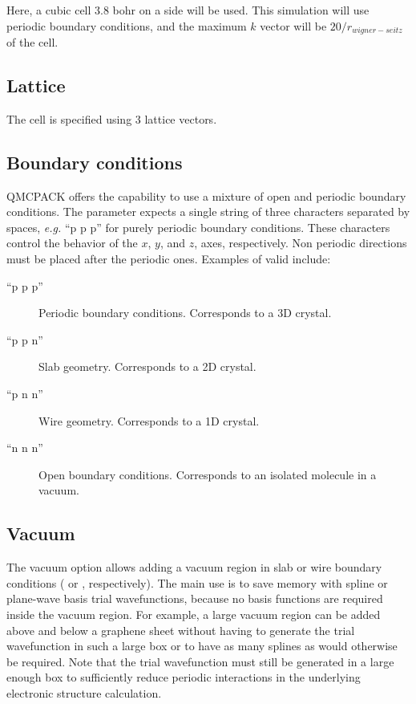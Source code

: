 Here, a cubic cell 3.8 bohr on a side will be used.
This simulation will use periodic boundary conditions, and the maximum
$k$ vector will be $20/r_{wigner-seitz}$ of the cell.


\subsection{Lattice}
The cell is specified using 3 lattice vectors.


\subsection{Boundary conditions}
QMCPACK offers the capability to use a mixture of open and periodic boundary conditions.
The  parameter expects a single string of three characters separated by
spaces, \textit{e.g.} ``p p p'' for purely periodic boundary conditions. These characters control
the behavior of the $x$, $y$, and $z$, axes, respectively. Non periodic directions must be placed after the periodic ones.
Examples of valid  include:

\begin{description}
\item[``p p p''] Periodic boundary conditions. Corresponds to a 3D crystal.
\item[``p p n''] Slab geometry. Corresponds to a 2D crystal.
\item[``p n n''] Wire geometry. Corresponds to a 1D crystal.
\item[``n n n''] Open boundary conditions. Corresponds to an isolated molecule in a vacuum.
\end{description}

\subsection{Vacuum}
The vacuum option allows adding a vacuum region in slab or wire boundary conditions
( or , respectively). The main use is
to save memory with spline or plane-wave basis trial wavefunctions, because no basis
functions are required inside the vacuum region. For example, a large vacuum region
can be added above and below a graphene sheet without having to generate the trial
wavefunction in such a large box or to have as many splines as would otherwise
be required. Note that the trial wavefunction must still be generated in a
large enough box to sufficiently reduce periodic interactions in the underlying
electronic structure calculation.

